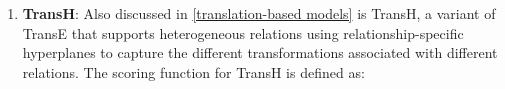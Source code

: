 \begin{enumerate}


    \item 
    \textbf{TransH}: Also discussed in \autoref{translation-based models} is TransH, a variant of TransE that supports heterogeneous relations using relationship-specific hyperplanes to capture the different transformations associated with different relations. The scoring function for TransH is defined as:
    

\end{enumerate}
